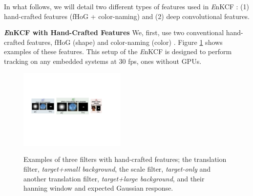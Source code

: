 \documentclass[10pt,twocolumn,letterpaper]{article}
\begin{document}
In what follows, we will detail two different types of features used
in {\it E}nKCF : (1) hand-crafted features (fHoG + color-naming) and
(2) deep convolutional features.

\textbf{{\it E}nKCF with Hand-Crafted Features} We, first, use two
conventional hand-crafted features, fHoG (shape)
\cite{felzenszwalb2010object} and color-naming (color)
\cite{li2014scale}. Figure \ref{fig:Filters} shows examples of these
features. This setup of the {\it E}nKCF is designed to perform
tracking on any embedded systems at $30$ fps, ones without GPUs.
\begin{figure}[!h]
\centering
\includegraphics[width=0.47\textwidth]{./figures/Filters_Details.pdf}
   \\[-3ex]
\label{fig:Rt_S}
\quad{}\label{fig:Rt_L}
\quad\quad{}\label{fig:Rs}
\caption{Examples of three filters with hand-crafted features; the translation filter,
  \textit{target+small background}, the scale filter,
  \textit{target-only} and another translation filter,
  \textit{target+large background}, and their hanning window and
  expected Gaussian response.}
\label{fig:Filters}
\end{figure}
\end{document}

